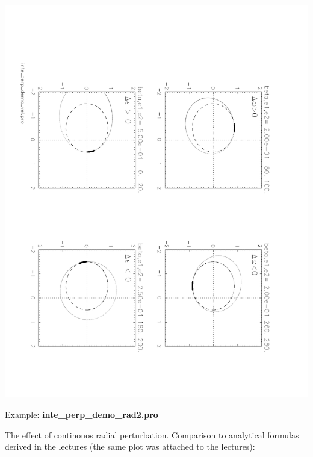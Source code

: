\documentclass[a4paper,12pt]{article}
\def\red{\color{red}}
\def\black{\color{RGBblack}}
\begin{document}
{{ \includegraphics[angle=90,width=0.75\paperwidth]{inte_perp_demo_vel.pdf}

\newpage
\black

Example: {\bf inte\_perp\_demo\_rad2.pro}

\bul The effect of continouos radial perturbation. Comparison to
analytical formulas derived in the lectures (the same plot was
attached to the lectures):

{\scriptsize \red

}\black

}}
\end{document}
